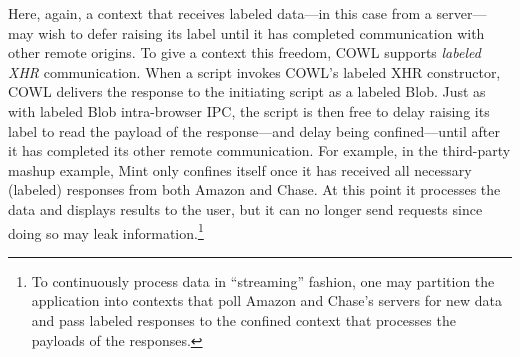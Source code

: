 %

Here, again, a context that receives labeled data---in this case from
a server---may wish to defer raising its label until it has
completed communication with other remote origins. To give a context
this freedom, COWL supports {\em labeled XHR} communication. When a
script invokes COWL's labeled XHR constructor, COWL delivers the
response to the initiating script as a labeled Blob. Just as with
labeled Blob intra-browser IPC, the script is then free to delay
raising its label to read the payload of the response---and delay
being confined---until after it has completed its other remote
communication.
%
For example, in the third-party mashup example, Mint only confines
itself once it has received all necessary (labeled) responses from
both Amazon and Chase. At this point it processes the data and
displays results to the user, but it can no longer send requests since
doing so may leak information.\footnote{To continuously process data
  in ``streaming'' fashion, one may partition the application into
  contexts that poll Amazon and Chase's servers for new data and pass
  labeled responses to the confined context that processes the
  payloads of the responses.}

